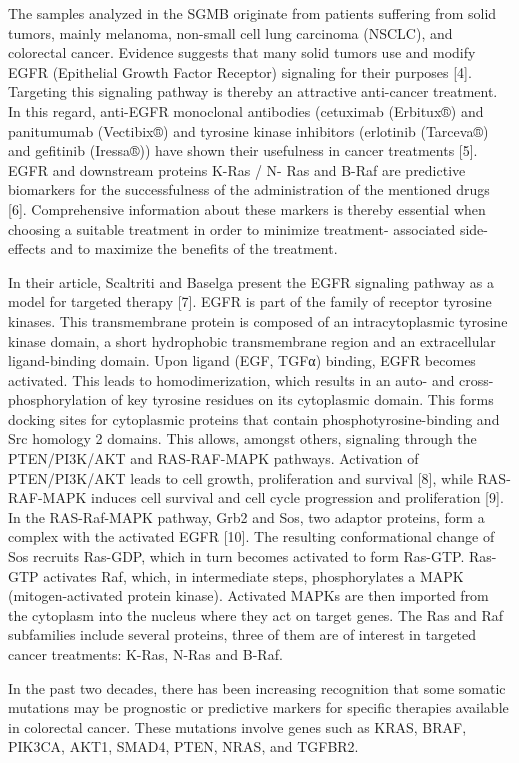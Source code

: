 The samples analyzed in the SGMB originate from patients suffering from solid
tumors, mainly melanoma, non-small cell lung carcinoma (NSCLC), and colorectal
cancer. Evidence suggests that many solid tumors use and modify EGFR (Epithelial
Growth Factor Receptor) signaling for their purposes [4]. Targeting this
signaling pathway is thereby an attractive anti-cancer treatment. In this
regard, anti-EGFR monoclonal antibodies (cetuximab (Erbitux®) and panitumumab
(Vectibix®) and tyrosine kinase inhibitors (erlotinib (Tarceva®) and gefitinib
(Iressa®)) have shown their usefulness in cancer treatments [5]. EGFR and
downstream proteins K-Ras / N- Ras and B-Raf are predictive biomarkers for the
successfulness of the administration of the mentioned drugs [6]. Comprehensive
information about these markers is thereby essential when choosing a suitable
treatment in order to minimize treatment- associated side-effects and to
maximize the benefits of the treatment.

In their article, Scaltriti and Baselga present the EGFR signaling pathway as a
model for targeted therapy [7]. EGFR is part of the family of receptor tyrosine
kinases. This transmembrane protein is composed of an intracytoplasmic tyrosine
kinase domain, a short hydrophobic transmembrane region and an extracellular
ligand-binding domain. Upon ligand (EGF, TGFα) binding, EGFR becomes activated.
This leads to homodimerization, which results in an auto- and
cross-phosphorylation of key tyrosine residues on its cytoplasmic domain. This
forms docking sites for cytoplasmic proteins that contain
phosphotyrosine-binding and Src homology 2 domains. This allows, amongst others,
signaling through the PTEN/PI3K/AKT and RAS-RAF-MAPK pathways. Activation of
PTEN/PI3K/AKT leads to cell growth, proliferation and survival [8], while
RAS-RAF-MAPK induces cell survival and cell cycle progression and proliferation
[9]. In the RAS-Raf-MAPK pathway, Grb2 and Sos, two adaptor proteins, form a
complex with the activated EGFR [10]. The resulting conformational change of Sos
recruits Ras-GDP, which in turn becomes activated to form Ras-GTP. Ras-GTP
activates Raf, which, in intermediate steps, phosphorylates a MAPK
(mitogen-activated protein kinase). Activated MAPKs are then imported from the
cytoplasm into the nucleus where they act on target genes. The Ras and Raf
subfamilies include several proteins, three of them are of interest in targeted
cancer treatments: K-Ras, N-Ras and B-Raf.

In the past two decades, there has been increasing recognition that some somatic
mutations may be prognostic or predictive markers for specific therapies
available in colorectal cancer. These mutations involve genes such as KR​AS,
BRAF, PIK3CA, AKT1, SMAD4, PTEN, NRAS, and TGFBR2.

